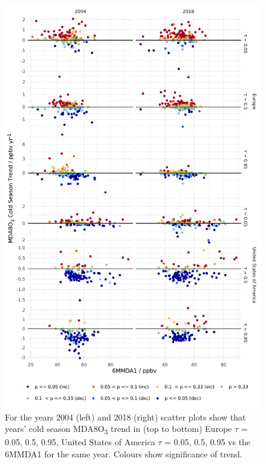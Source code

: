 \documentclass{article}
\begin{document}
\begin{figure}[p]
\centering
\includegraphics[height=0.75\textheight]{figures/si_figures/fS24_mda8_cold_sig_mda8_6mmda1.pdf}
\caption{For the years 2004 (left) and 2018 (right) scatter plots show that years' cold season MDA8O\textsubscript{3} trend in (top to bottom) Europe $\tau$ = 0.05, 0.5, 0.95, United States of America $\tau$ = 0.05, 0.5, 0.95 vs the 6MMDA1 for the same year. Colours show significance of trend.}
\label{si_fig:mda8_cold_sig_mda8_6mmda1}
\end{figure}
\clearpage
\end{document}
